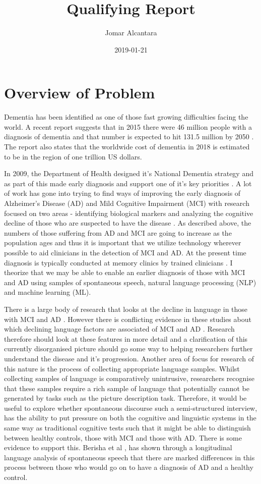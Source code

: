 \documentclass[10pt, letterpaper, twoside, openany]{book}
\title{Qualifying Report}
\date{2019-01-21}
\author{Jomar Alcantara}
\begin{document}
\maketitle
\newpage
\tableofcontents
\listoftables
\listoffigures
\newpage
\chapter{Overview of Problem}
Dementia has been identified as one of those fast growing difficulties facing the world. A recent report suggests that in 2015 there were 46 million people with a diagnosis of dementia and that number is expected to hit 131.5 million by 2050 \cite{Prince2015}. The report also states that the worldwide cost of dementia in 2018 is estimated to be in the region of one trillion US dollars.
\par
In 2009, the Department of Health designed it's National Dementia strategy and as part of this made early diagnosis and support one of it's key priorities \cite{England2009}. A lot of work has gone into trying to find ways of improving the early diagnosis of Alzheimer's Disease (AD) and Mild Cognitive Impairment (MCI) with research focused on two areas - identifying biological markers and analyzing the cognitive decline of those who are suspected to have the disease \cite{Taler2008}. As described above, the numbers of those suffering from AD and MCI are going to increase as the population ages \cite{Prince2015} and thus it is important that we utilize technology wherever possible to aid clinicians in the detection of MCI and AD. At the present time diagnosis is typically conducted at memory clinics by trained clinicians \cite{Boschi2017}. I theorize that we may be able to enable an earlier diagnosis of those with MCI and AD using samples of spontaneous speech, natural language processing (NLP) and machine learning (ML).
\par
There is a large body of research that looks at the decline in language in those with MCI and AD \cite{Taler2008, Boschi2017}. However there is conflicting evidence in these studies about which declining language factors are associated of MCI and AD \cite{Taler2008, Boschi2017}. Research therefore should look at these features in more detail and a clarification of this currently disorganised picture should go some way to helping researchers further understand the disease and it's progression. Another area of focus for research of this nature is the process of collecting appropriate language samples. Whilst collecting samples of language is comparatively unintrusive, researchers recognise that these samples require a rich sample of language that potentially cannot be generated by tasks such as the picture description task. Therefore, it would be useful to explore whether spontaneous discourse such a semi-structured interview, has the ability to put pressure on both the cognitive and linguistic systems in the same way as traditional cognitive tests such that it might be able to distinguish between healthy controls, those with MCI and those with AD. There is some evidence to support this. Berisha et al \cite{Berisha2015}, has shown through a longitudinal language analysis of spontaneous speech that there are marked differences in this process between those who would go on to have a diagnosis of AD and a healthy control. 
\end{document}
